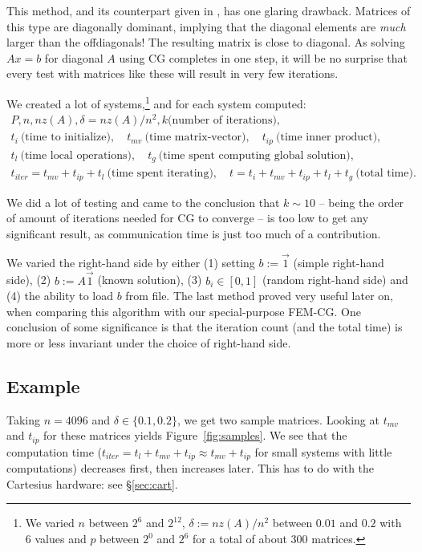 \documentclass[11pt]{amsart}
\theoremstyle{definition}
\begin{document}
This method, and its counterpart given in \cite[Ex.~4.6]{biss04}, has one glaring drawback. Matrices of this type are diagonally dominant, implying that the diagonal elements are \emph{much} larger than the offdiagonals! The resulting matrix is close to diagonal. As solving $Ax=b$ for diagonal $A$ using CG completes in one step, it will be no surprise that every test with matrices like these will result in very few iterations.

We created a lot of systems,\footnote{We varied $n$ between $2^6$ and $2^{12}$, $\delta := nz(A)/n^2$ between $0.01$ and $0.2$ with 6 values and $p$ between $2^0$ and $2^6$ for a total of about 300 matrices. } and for each system computed:
\begin{gather*} 
P, n, nz(A), \delta = nz(A)/n^2, k \text{(number of iterations)}, \\
t_i~ \text{(time to initialize)}, \quad t_{mv}~ \text{(time matrix-vector)}, \quad t_{ip}~ \text{(time inner product)}, \\
t_l~ \text{(time local operations)}, \quad t_g~ \text{(time spent computing global solution)}, \\
t_{iter} = t_{mv} + t_{ip} + t_l~ \text{(time spent iterating)}, \quad t = t_i + t_{mv} + t_{ip} + t_l + t_g~ \text{(total time)}.
\end{gather*}

We did a lot of testing and came to the conclusion that $k\sim 10$ -- being the order of amount of iterations needed for CG to converge --  is too low to get any significant result, as communication time is just too much of a contribution. 

We varied the right-hand side by either (1) setting $b := \vec 1$ (simple right-hand side), (2) $b := A\vec 1$ (known solution), (3) $b_i \in [0, 1]$ (random right-hand side) and (4) the ability to load $b$ from file. The last method proved very useful later on, when comparing this algorithm with our special-purpose FEM-CG. One conclusion of some significance is that the iteration count (and the total time) is more or less invariant under the choice of right-hand side.

\subsection{Example}
Taking $n = 4096$ and $\delta \in \{0.1, 0.2\}$, we get two sample matrices. Looking at $t_{mv}$ and $t_{ip}$ for these matrices yields Figure~\ref{fig:samples}. We see that the computation time ($t_{iter} = t_l + t_{mv} + t_{ip} \approx t_{mv} + t_{ip}$ for small systems with little computations) decreases first, then increases later. This has to do with the Cartesius hardware: see \S \ref{sec:cart}.
\end{document}
